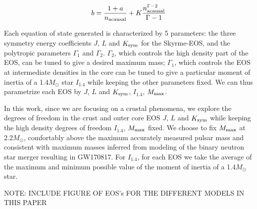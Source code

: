 \documentclass[fleqn,usenatbib]{mnras}
\begin{document}
\begin{equation}
b = \frac{1+a}{n_{\rm acausal}} + K \frac{n_{\rm acausal}^{\Gamma-2}}{\Gamma-1}
\end{equation}

Each equation of state generated is characterized by 5 parameters: the three symmetry energy coefficients $J$, $L$ and $K_{\rm sym}$ for the Skyrme-EOS, and the polytropic parameters $\Gamma_1$ and $\Gamma_2$. $\Gamma_2$, which controls the high density part of the EOS, can be tuned to give a desired maximum mass; $\Gamma_1$, which controls the EOS at intermediate densities in the core can be tuned to give a particular moment of inertia of a 1.4$M_{\odot}$ star $I_{1.4}$ while keeping the other parameters fixed. We can thus parametrize each EOS by $J$, $L$ and $K_{\rm sym}$, $I_{1.4}$, $M_{\rm max}$.

In this work, since we are focusing on a crustal phenomena, we explore the degrees of freedom in the crust and outer core EOS $J$, $L$ and $K_{\rm sym}$ while keeping the high density degrees of freedom $I_{1.4}$, $M_{\rm max}$ fixed. We choose to fix $M_{\rm max}$ at 2.2$M_{\odot}$, comfortably above the maximum accurately measured pulsar mass and consistent with maximum masses inferred from modeling of the binary neutron star merger resulting in GW170817. For $I_{1.4}$, for each EOS we take the average of the maximum and minimum possible value of the moment of inertia of a 1.4$M_{\odot}$ star.

NOTE: INCLUDE FIGURE OF EOS's FOR THE DIFFERENT MODELS IN THIS PAPER













\end{document}
